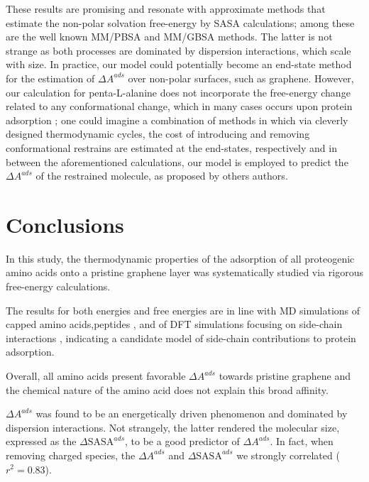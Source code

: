 \documentclass[journal=jcisd8,manuscript=article,layout=twocolumn]{achemso}
\begin{document}
 These results are promising and resonate with approximate methods that estimate the non-polar solvation free-energy by SASA calculations; among these are the well known MM/PBSA and MM/GBSA methods.\cite{Wang2019}
 The latter is not strange as both processes are dominated by dispersion interactions, which scale with size.
 In practice, our model could potentially become an end-state method for the estimation of $\Delta A^{ads}$ over non-polar surfaces, such as graphene.
 However, our calculation for penta-L-alanine does not incorporate the free-energy change related to any conformational change, which in many cases occurs upon protein adsorption \cite{Duan_2015,Chong2015}; one could imagine a combination of methods in which via cleverly designed thermodynamic cycles, the cost of introducing and removing conformational restrains are estimated at the end-states, respectively and in between the aforementioned calculations, our model is employed to predict the $\Delta A^{ads}$ of the restrained molecule, as proposed by others authors.\cite{Leitgeb_2005,Mobley_2007,Gumbart2013}


\section{Conclusions}

In this study, the thermodynamic properties of the adsorption of all proteogenic amino acids onto a pristine graphene layer was systematically studied via rigorous free-energy calculations.

The results for both energies and free energies are in line with MD simulations of capped amino acids\cite{Dasetty2019, Dragneva_2013},peptides \cite{Pandey_2012}, and of DFT simulations focusing on side-chain interactions \cite{Tavassoli_2015, Singla_2016, Zhiani_2017}, indicating a candidate model of side-chain contributions to protein adsorption.

Overall, all amino acids  present favorable $\Delta A^{ads}$ towards pristine graphene and the chemical nature of the amino acid does not explain this broad affinity.

$\Delta A^{ads}$  was found to be an energetically driven phenomenon and dominated by dispersion interactions. Not strangely, the latter rendered the molecular size, expressed as the $\Delta \textrm{SASA}^{ads}$, to be a good predictor of $\Delta A^{ads}$. In fact, when removing charged species, the  $\Delta A^{ads}$ and $\Delta \textrm{SASA}^{ads}$ we strongly correlated ($r^2=0.83$).
\end{document}
